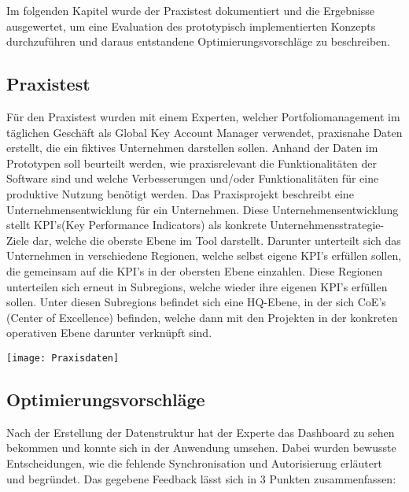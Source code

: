Im folgenden Kapitel wurde der Praxistest dokumentiert und die Ergebnisse ausgewertet, um eine Evaluation des prototypisch implementierten Konzepts durchzuführen und daraus entstandene Optimierungsvorschläge zu beschreiben.
\subsection{Praxistest}
Für den Praxistest wurden mit einem Experten, welcher Portfoliomanagement im täglichen Geschäft als Global Key Account Manager verwendet, praxisnahe Daten erstellt, die ein fiktives Unternehmen darstellen sollen. Anhand der Daten im Prototypen soll beurteilt werden, wie praxisrelevant die Funktionalitäten der Software sind und welche Verbesserungen und/oder Funktionalitäten für eine produktive Nutzung benötigt werden. Das Praxisprojekt beschreibt eine Unternehmensentwicklung für ein Unternehmen. Diese Unternehmensentwicklung stellt KPI's(Key Performance Indicators) als konkrete Unternehmensstrategie-Ziele dar, welche die oberste Ebene im Tool darstellt. Darunter unterteilt sich das Unternehmen in verschiedene Regionen, welche selbst eigene KPI's erfüllen sollen, die gemeinsam auf die KPI's in der obersten Ebene einzahlen. Diese Regionen unterteilen sich erneut in Subregions, welche wieder ihre eigenen KPI's erfüllen sollen. Unter diesen Subregions befindet sich eine HQ-Ebene, in der sich CoE's (Center of Excellence) befinden, welche dann mit den Projekten in der konkreten operativen Ebene darunter verknüpft sind.

\vspace{20pt}
\begin{center}
    \begin{minipage}{1\linewidth}
        \texttt{[image: Praxisdaten]}
    \end{minipage}
\end{center}
\vspace{20pt}

\subsection{Optimierungsvorschläge}
Nach der Erstellung der Datenstruktur hat der Experte das Dashboard zu sehen bekommen und konnte sich in der Anwendung umsehen. Dabei wurden bewusste Entscheidungen, wie die fehlende Synchronisation und Autorisierung erläutert und begründet.
Das gegebene Feedback lässt sich in 3 Punkten zusammenfassen:

